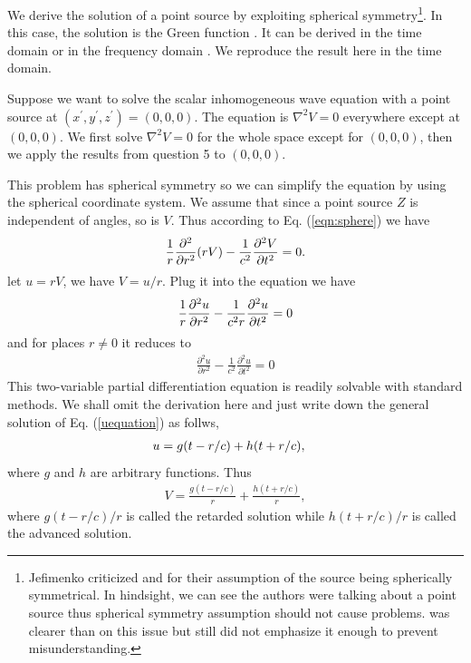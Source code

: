 \documentclass[11pt]{article}              %
\begin{document}
We derive the solution of a point source by exploiting spherical symmetry\footnote{Jefimenko criticized \cite{becker1982electromagnetic} and \cite{heald1995classical} for their assumption of the source being spherically symmetrical. In hindsight, we can see the authors were talking about a point source thus spherical symmetry assumption should not cause problems. \cite{heald1995classical} was clearer than \cite{becker1982electromagnetic} on this issue but still did not emphasize it enough to prevent misunderstanding.}. In this case, the solution is the Green function \cite{panofsky1962classical} \cite{podolsky1969fundamentals} \cite{barut1980electrodynamics} \cite{jackson1998classical} \cite{melia2001electrodynamics} \cite{franklin2017classical}. It can be derived in the time domain 
\cite{podolsky1969fundamentals} \cite{landau1971classical} \cite{wangsness1986electromagnetic} \cite{pauli2000electrodynamics} \cite{steane2012relativity} \cite{zangwill2013modern} or in the frequency domain \cite{panofsky1962classical} \cite{jackson1998classical} \cite{schwinger1998classical} \cite{pauli2000electrodynamics} \cite{scheck2012classical} . We reproduce the result here in the time domain.

Suppose we want to solve the scalar inhomogeneous wave equation with a point source at $(x^\prime,y^\prime,z^\prime)=(0,0,0)$. The equation is $\nabla^2 V=0$ everywhere except at $(0,0,0)$. We first solve $\nabla^2 V=0$ for the whole space except for $(0,0,0)$, then we apply the results from question 5 to $(0,0,0)$.

This problem has spherical symmetry so we can simplify the equation by using the spherical coordinate system. We assume that since a point source $Z$ is independent of angles, so is $V$. Thus according to Eq. (\ref{eqn:sphere}) we have
\begin{equation}
    \frac{1}{r}\frac{\partial^2}{\partial r^2}(rV)-\frac{1}{c^2}\frac{\partial^2 V}{\partial t^2}=0.\notag
\end{equation}
let $u=rV$, we have $V=u/r$. Plug it into the equation we have
\begin{align}
    \frac{1}{r}\frac{\partial^2 u}{\partial r^2}-\frac{1}{c^2r}\frac{\partial^2 u}{\partial t^2}=0\notag
\end{align}
and for places $r\neq 0$ it reduces to 
\begin{align}
    \frac{\partial^2 u}{\partial r^2}-\frac{1}{c^2}\frac{\partial^2 u}{\partial t^2}=0\label{uequation}
\end{align}
This two-variable partial differentiation equation is readily solvable with standard methods. We shall omit the derivation here and just write down the general solution of Eq. (\ref{uequation}) as follws,
\begin{align}
    u&=g(t-r/c)+h(t+r/c),\notag
\end{align}
where $g$ and $h$ are arbitrary functions. Thus
\begin{align}
    V=\frac{g(t-r/c)}{r}+\frac{h(t+r/c)}{r},
\end{align}
where $g(t-r/c)/r$ is called the retarded solution while $h(t+r/c)/r$ is called the advanced solution.
\end{document}
